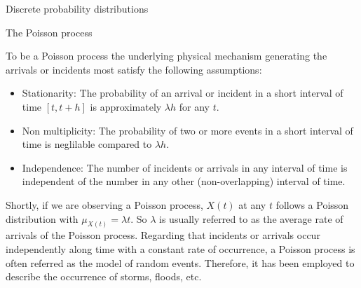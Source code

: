 \documentclass[8pt]{beamer}
\renewcommand{\emph}[1]{\textcolor{myorange}{#1}}
\begin{document}
 \begin{frame}{Discrete probability distributions}
    \begin{block}{The \alert{Poisson} process}
    \end{block}
    To be a \emph{Poisson process} the underlying physical mechanism generating the \emph{arrivals} or \emph{incidents} most satisfy the following assumptions:
    \begin{itemize}
        \item \alert{Stationarity}: The probability of an \emph{arrival} or \emph{incident} in a short interval of time $[t, t + h]$ is approximately $\lambda h$ for any $t$.
        \item \alert{Non multiplicity}: The probability of two or more events in a short interval of time is neglilable compared to $\lambda h$.
    \item \alert{Independence}: The number of \emph{incidents} or \emph{arrivals} in any interval of time is  independent of the number in any other (non-overlapping) interval of time.
    \end{itemize}
    Shortly, if we are observing a \emph{Poisson process},  $X(t)$ at any $t$ follows a \emph{Poisson distribution} with $\mu_{X(t)} = \lambda t$. So $\lambda$ is  usually referred to as the \emph{average rate of arrivals} of the \emph{Poisson process}. Regarding that \emph{incidents} or \emph{arrivals} occur independently along time with a constant rate of occurrence, a \emph{Poisson process} is often referred as the model of random events. Therefore, it has been employed to describe the occurrence of storms, floods, etc. 
\end{frame}
   
\end{document}

